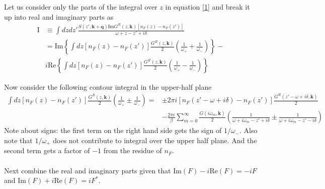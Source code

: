 \documentclass[]{article}
\newcommand{\kk}{\mathbf{k}}
\newcommand{\qq}{\mathbf{q}}
\newcommand{\iwm}{i\omega_m}
\newcommand{\imG}{\mathrm{Im} G^R(z, \kk)}
\begin{document}
Let us consider only the parts of the integral over $z$ in equation \ref{1} and break it up into real and imaginary parts as
\begin{equation}
\begin{split}
\mathrm{I} & \equiv \int dz dz' \frac{ S(z', \kk+\qq)\imG \left[n_F(z)-n_F(z')\right]}{\omega+z-z'+i\delta} \\
& = \mathrm{Im} \left\lbrace \int dz \left[n_F(z)-n_F(z')\right] \frac{G^R(z,\kk)}{2}\left(\frac{1}{\omega_+} + \frac{1}{\omega_-} \right) \right\rbrace - \\
& i \mathrm{Re} \left\lbrace \int dz \left[n_F(z)-n_F(z')\right] \frac{G^R(z,\kk)}{2} \left( \frac{1}{\omega_+} - \frac{1}{\omega_-} \right) \right\rbrace
\end{split}
\end{equation}


Now consider the following contour integral in the upper-half plane
\begin{equation}
\begin{split}
\int dz \left[n_F(z) - n_F(z')\right] \frac{G^R(z,\kk)}{2}\left(\frac{1}{\omega_+} \pm \frac{1}{\omega_-} \right) = & \pm 2\pi i \left[n_F(z'-\omega+i\delta) - n_F(z')\right]\frac{G^R(z'-\omega+i\delta,\kk)}{2} \\ &- \frac{2\pi i}{\beta}\sum_{m=0}^{\infty}  \frac{G(\iwm,\kk)}{2}\left(\frac{1}{\omega+\iwm-z'+i\delta} \pm \frac{1}{\omega+\iwm-z'-i\delta} \right) 
\end{split}
\end{equation}
Note about signs: the first term on the right hand side gets the sign of $1/\omega_-$. Also note that $1/\omega_+$ does not contribute to integral over the upper half plane. And the second term gets a factor of $-1$ from the residue of $n_F$.
\\
\\
Next combine the real and imaginary parts given that $\mathrm{Im}(F)-i\mathrm{Re}(F)=-i F$ and $\mathrm{Im}(F)+i\mathrm{Re}(F)= i F^*$.
\end{document}
